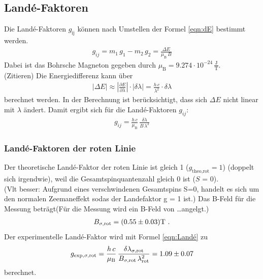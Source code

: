 \subsection{Landé-Faktoren}
Die Landé-Faktoren $g_\text{ij}$ können nach Umstellen der Formel \eqref{eqn:dE} bestimmt werden.
\begin{align}
  g_{ij} = m_1\,g_1 - m_2\,g_2 = \frac{\Delta E}{\mu_\text{B}\,B}
\end{align}
Dabei ist das Bohrsche Magneton gegeben durch $\mu_\text{B} = 9.274 \cdot 10^{-24}\,\frac{\text{J}}{\text{T}}$.\\ (Zitieren)
Die Energiedifferenz kann über
\begin{align}
  |\Delta E| \approx \left| \frac{\partial E}{\partial \lambda}\right| \cdot |\delta\lambda| = \frac{h\,c}{\lambda^2}\cdot \delta\lambda
\end{align}
berechnet werden. In der Berechnung ist berücksichtigt, dass sich $\Delta E$ nicht linear mit $\lambda$ ändert. Damit ergibt sich für die Landé-Faktoren $g_{ij}$:
\begin{align}
  g_{ij} = \frac{h\,c}{\mu_\text{B}}\,\frac{\delta\lambda}{B\,\lambda^2}
  \label{eqn:Landé}
\end{align}



\subsubsection{Landé-Faktoren der roten Linie}
Der theoretische Landé-Faktor der roten Linie ist gleich 1 ($g_\text{theo,rot} = 1$) (doppelt sich irgendwie), weil die Gesamtspinquantenzahl gleich 0 ist ($S$ = 0). \\ (Vlt besser: Aufgrund eines verschwindenen Gesamtspins S=0, handelt es sich um den normalen Zeemaneffekt sodas der Landefaktor g = 1 ist.)
Das B-Feld für die Messung beträgt(Für die Messung wird ein B-Feld von \ldots angelgt.)
\begin{align*}
  B_{\sigma,\text{rot}} = (\num{0.55 +- 0.03}) \text{T} \ .
\end{align*}
Der experimentelle Landé-Faktor wird mit Formel \eqref{eqn:Landé} zu
\begin{align*}
  g_{\text{exp},\sigma,\text{rot}} = \frac{h\,c}{\mu_\text{B}}\,\frac{\delta \lambda_{\sigma,\text{rot}}}{B_{\sigma,\text{rot}}\,\lambda_\text{rot}^2} = \num{1.09 +- 0.07}
\end{align*}
berechnet.



